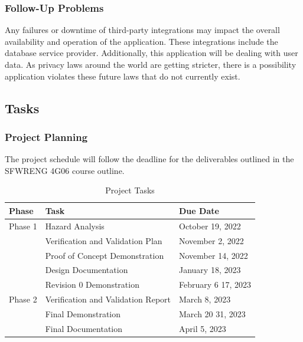 \documentclass[12pt]{article}
\begin{document}
\subsubsection{Follow-Up Problems}

Any failures or downtime of third-party integrations may impact the overall availability and
operation of the application. These integrations include the database service provider.
Additionally, this application will be dealing with user data. As privacy laws around the world are
getting stricter, there is a possibility application violates these future laws that do not
currently exist.

\subsection{Tasks}
\subsubsection{Project Planning}
The project schedule will follow the deadline for the deliverables outlined in the SFWRENG 4G06
course outline.

\begin{table}[H]
	\centering
	\caption{Project Tasks}
	\vspace{5pt}
	\begin{tabular}{|p{}|p{}|p{}|}
		\hline
		\textbf{Phase} & \textbf{Task}                      & \textbf{Due Date}                 \\
		\hline
		Phase 1        & Hazard Analysis                    & October 19, 2022                  \\
		\cline{2-3}    & Verification and Validation Plan   & November 2, 2022                  \\
		\cline{2-3}    & Proof of Concept Demonstration     & November 14, 2022                 \\
		\cline{2-3}    & Design Documentation               & January 18, 2023                  \\
		\cline{2-3}    & Revision 0 Demonstration           & February 6 \textemdash{} 17, 2023 \\
		\hline
		Phase 2        & Verification and Validation Report & March 8, 2023                     \\
		\cline{2-3}    & Final Demonstration                & March 20 \textemdash{} 31, 2023   \\
		\cline{2-3}    & Final Documentation                & April 5, 2023                     \\
		\hline
	\end{tabular}

	\label{project_tasks}
\end{table}
\end{document}
